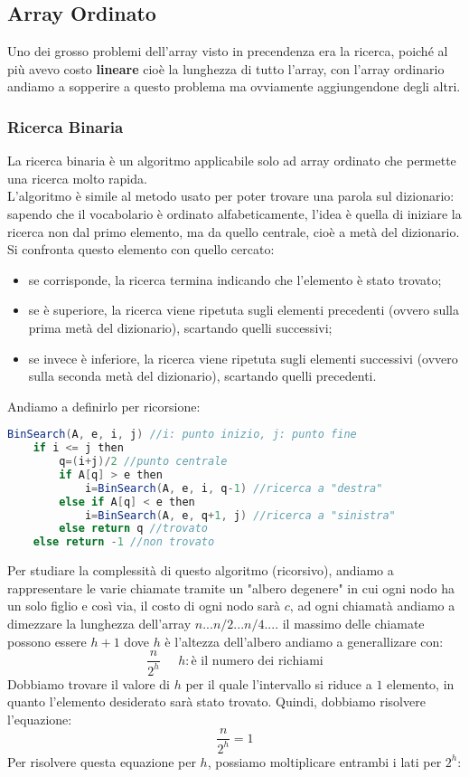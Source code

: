 \subsection{Array Ordinato}
Uno dei grosso problemi dell'array visto in precendenza era la ricerca, poiché al più avevo costo \textbf{lineare} cioè la lunghezza di tutto l'array, con l'array ordinario andiamo a sopperire a questo problema ma ovviamente aggiungendone degli altri.

\subsubsection{Ricerca Binaria}
La ricerca binaria è un algoritmo applicabile solo ad array ordinato che permette una ricerca molto rapida.\\
L'algoritmo è simile al metodo usato per poter trovare una parola sul dizionario: sapendo che il vocabolario è ordinato alfabeticamente, l'idea è quella di iniziare la ricerca non dal primo elemento, ma da quello centrale, cioè a metà del dizionario. Si confronta questo elemento con quello cercato:
\begin{itemize}
\item se corrisponde, la ricerca termina indicando che l'elemento è stato trovato;
    \item se è superiore, la ricerca viene ripetuta sugli elementi precedenti (ovvero sulla prima metà del dizionario), scartando quelli successivi;
    \item se invece è inferiore, la ricerca viene ripetuta sugli elementi successivi (ovvero sulla seconda metà del dizionario), scartando quelli precedenti.
\end{itemize}
Andiamo a definirlo per ricorsione:
\begin{lstlisting}[language=Java]
BinSearch(A, e, i, j) //i: punto inizio, j: punto fine
	if i <= j then
		q=(i+j)/2 //punto centrale
		if A[q] > e then
			i=BinSearch(A, e, i, q-1) //ricerca a "destra"
		else if A[q] < e then
			i=BinSearch(A, e, q+1, j) //ricerca a "sinistra"
		else return q //trovato
	else return -1 //non trovato
\end{lstlisting}
Per studiare la complessità di questo algoritmo (ricorsivo), andiamo a rappresentare le varie chiamate tramite un "albero degenere" in cui ogni nodo ha un solo figlio e così via, il costo di ogni nodo sarà $c$, ad ogni chiamatà andiamo a dimezzare la lunghezza dell'array $n... n/2... n/4....$ il massimo delle chiamate possono essere $h+1$ dove $h$ è l'altezza dell'albero andiamo a generallizare con:
$$ \frac{n}{2^h} \;\;\;\;\; h: \text{è il numero dei richiami} $$
Dobbiamo trovare il valore di $h$ per il quale l'intervallo si riduce a $1$ elemento, in quanto l'elemento desiderato sarà stato trovato. Quindi, dobbiamo risolvere l'equazione:
$$ \frac{n}{2^h} = 1$$
Per risolvere questa equazione per $h$, possiamo moltiplicare entrambi i lati per $2^h$:

